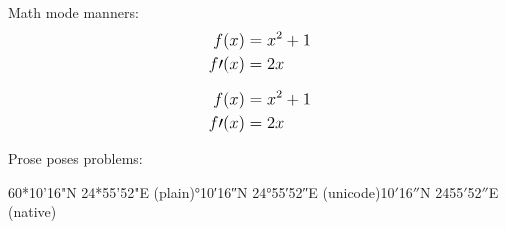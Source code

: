 \documentclass{article}
\begin{document}
\fontsize{12}{16}
\selectfont

Math mode manners:
\[\mathlarger{\begin{aligned}
	f(x) & = x^{2} + 1 \\
	f\prime(x) & = 2x
\end{aligned}}\]

\[\mathlarger{\begin{aligned}
	f(x) & = x^{2} + 1 \\
	f\prime(x) & = 2x
\end{aligned}}\]

Prose poses problems:
\smallskip

\raggedright{
	60*10'16"N 24*55'52"E (plain)°10′16″N 24°55′52″E (unicode)\textdegree{}10\ensuremath{\prime}16\ensuremath{\dprime}N 24\textdegree{}55\ensuremath{\prime}52\ensuremath{\dprime}E (native)
}
\end{document}
